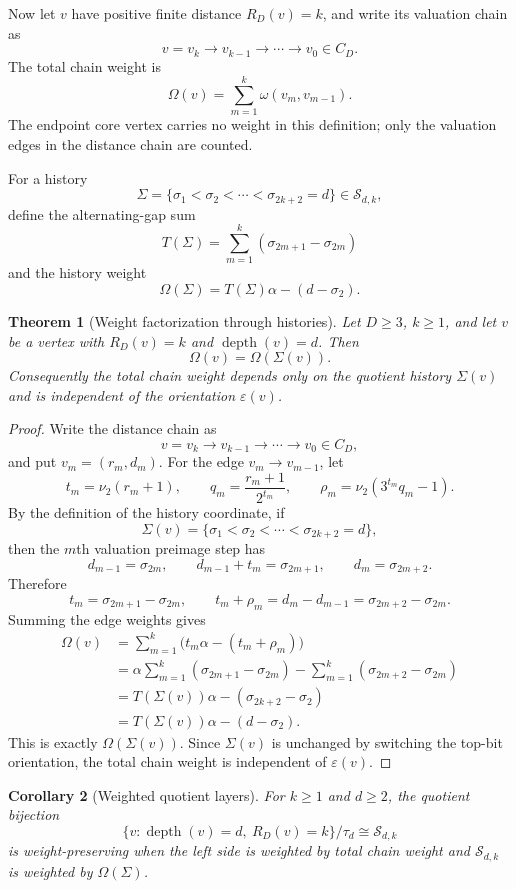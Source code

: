 \documentclass[11pt]{amsart}
\newtheorem{theorem}{Theorem}[section]
\newtheorem{corollary}[theorem]{Corollary}
\theoremstyle{definition}
\theoremstyle{remark}
\newcommand{\nuu}{\nu_2}
\newcommand{\depth}{\operatorname{depth}}
\newcommand{\Sfam}{\mathcal S}
\newcommand{\eps}{\varepsilon}
\begin{document}
Now let $v$ have positive finite distance $R_D(v)=k$, and write its valuation chain as
\[
v=v_k\to v_{k-1}\to\cdots\to v_0\in C_D.
\]
The total chain weight is
\[
\Omega(v)=\sum_{m=1}^k \omega(v_m,v_{m-1}).
\]
The endpoint core vertex carries no weight in this definition; only the valuation edges in the distance chain are counted.

For a history
\[
\Sigma=\{\sigma_1<\sigma_2<\cdots<\sigma_{2k+2}=d\}\in\Sfam_{d,k},
\]
define the alternating-gap sum
\[
T(\Sigma)=\sum_{m=1}^k(\sigma_{2m+1}-\sigma_{2m})
\]
and the history weight
\[
\Omega(\Sigma)=T(\Sigma)\alpha-(d-\sigma_2).
\]

\begin{theorem}[Weight factorization through histories]\label{thm:weightfactor}
Let $D\ge3$, $k\ge1$, and let $v$ be a vertex with $R_D(v)=k$ and $\depth(v)=d$.  Then
\[
\Omega(v)=\Omega(\Sigma(v)).
\]
Consequently the total chain weight depends only on the quotient history $\Sigma(v)$ and is independent of the orientation $\eps(v)$.
\end{theorem}

\begin{proof}
Write the distance chain as
\[
v=v_k\to v_{k-1}\to\cdots\to v_0\in C_D,
\]
and put $v_m=(r_m,d_m)$.  For the edge $v_m\to v_{m-1}$, let
\[
t_m=\nuu(r_m+1),\qquad q_m=\frac{r_m+1}{2^{t_m}},\qquad \rho_m=\nuu(3^{t_m}q_m-1).
\]
By the definition of the history coordinate, if
\[
\Sigma(v)=\{\sigma_1<\sigma_2<\cdots<\sigma_{2k+2}=d\},
\]
then the $m$th valuation preimage step has
\[
d_{m-1}=\sigma_{2m},\qquad d_{m-1}+t_m=\sigma_{2m+1},\qquad d_m=\sigma_{2m+2}.
\]
Therefore
\[
t_m=\sigma_{2m+1}-\sigma_{2m},
\qquad
 t_m+\rho_m=d_m-d_{m-1}=\sigma_{2m+2}-\sigma_{2m}.
\]
Summing the edge weights gives
\begin{align*}
\Omega(v)
&=\sum_{m=1}^k\bigl(t_m\alpha-(t_m+\rho_m)\bigr)\\
&=\alpha\sum_{m=1}^k(\sigma_{2m+1}-\sigma_{2m})
  -\sum_{m=1}^k(\sigma_{2m+2}-\sigma_{2m})\\
&=T(\Sigma(v))\alpha-(\sigma_{2k+2}-\sigma_2)\\
&=T(\Sigma(v))\alpha-(d-\sigma_2).
\end{align*}
This is exactly $\Omega(\Sigma(v))$.  Since $\Sigma(v)$ is unchanged by switching the top-bit orientation, the total chain weight is independent of $\eps(v)$.
\end{proof}

\begin{corollary}[Weighted quotient layers]\label{cor:weightedquotient}
For $k\ge1$ and $d\ge2$, the quotient bijection
\[
\{v:\depth(v)=d,\ R_D(v)=k\}/\tau_d\cong\Sfam_{d,k}
\]
is weight-preserving when the left side is weighted by total chain weight and $\Sfam_{d,k}$ is weighted by $\Omega(\Sigma)$.
\end{corollary}
\end{document}
